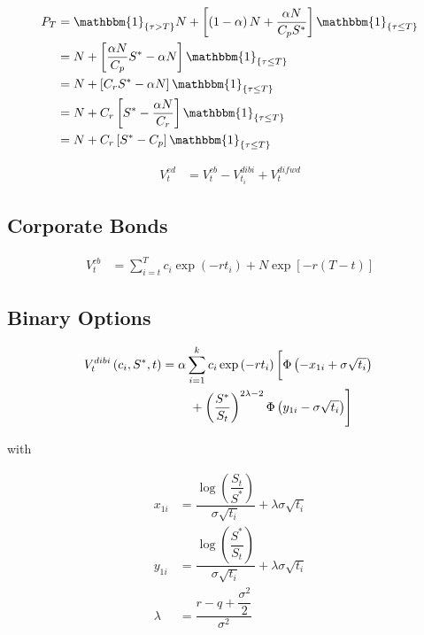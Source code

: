 \begin{align}
    P_T &= \mathbbm{1}_{\{ \tau > T \}} N +\left[ \left( 1 - \alpha \right) N + \dfrac{\alpha N}{C_p S^*} \right] \mathbbm{1}_{\{ \tau \leq T \}}\nonumber\\
    &= N + \left[ \dfrac{\alpha N}{C_p} S^* - \alpha N \right] \mathbbm{1}_{\{ \tau \leq T \}}\nonumber\\
    &= N + \left[ C_r S^* - \alpha N \right] \mathbbm{1}_{\{ \tau \leq T \}}\nonumber\\
    &= N + C_r \left[S^* - \dfrac{\alpha N}{C_r}\right] \mathbbm{1}_{\{ \tau \leq T \}}\nonumber\\
    &= N + C_r \left[ S^* - C_p \right] \mathbbm{1}_{\{ \tau \leq T \}}\nonumber
\end{align}

\begin{align}
    V^{ed}_t &= V^{cb}_t - V_{t_i}^{dibi} + V_t^{difwd}
\end{align}

\subsection{Corporate Bonds}
\begin{align}
    V^{cb}_t &= \sum^T_{i=t}c_i \exp\left(-r t_i\right) + N \exp\left[-r\left(T-t\right)\right]
\end{align}

\subsection{Binary Options}

\begin{align}
    V_t^{dibi}\left( c_i, S^*, t \right) &= \alpha \sum^k_{i=1} c_i \exp\left(-r t_i\right) \left[ \Phi\left(-x_{1i} + \sigma \sqrt{t_i}\right)\vphantom{\dfrac{S^*}{S}}\right.\nonumber\\
   &\qquad \left.\vphantom{\dfrac{S^*}{S_t}} +\left(\dfrac{S^*}{S_t}\right)^{2\lambda -2} \Phi\left(y_{1i} - \sigma \sqrt{t_i}\right) \right]
\end{align}

with 

\begin{align*}
x_{1i} &= \dfrac{\log \left( \dfrac{S_t}{S^*} \right)}{\sigma \sqrt{t_i}} + \lambda \sigma \sqrt{t_i}\\
y_{1i} &= \dfrac{\log \left( \dfrac{S^*}{S_t} \right)}{\sigma \sqrt{t_i}} + \lambda \sigma \sqrt{t_i}\\
\lambda &= \dfrac{r-q+\dfrac{\sigma^2}{2}}{\sigma^2}
\end{align*}

